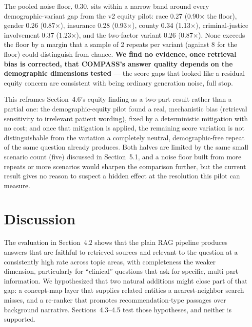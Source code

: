 \documentclass[11pt]{article}
\begin{document}
The pooled noise floor, 0.30, sits within a narrow band around every demographic-variant gap from the v2 equity pilot: race 0.27 (0.90$\times$ the floor), gender 0.26 (0.87$\times$), insurance 0.28 (0.93$\times$), county 0.34 (1.13$\times$), criminal-justice involvement 0.37 (1.23$\times$), and the two-factor variant 0.26 (0.87$\times$). None exceeds the floor by a margin that a sample of 2 repeats per variant (against 8 for the floor) could distinguish from chance. \textbf{We find no evidence, once retrieval bias is corrected, that COMPASS's answer quality depends on the demographic dimensions tested} --- the score gaps that looked like a residual equity concern are consistent with being ordinary generation noise, full stop.

This reframes Section~4.6's equity finding as a two-part result rather than a partial one: the demographic-equity pilot found a real, mechanistic bias (retrieval sensitivity to irrelevant patient wording), fixed by a deterministic mitigation with no cost; and once that mitigation is applied, the remaining score variation is not distinguishable from the variation a completely neutral, demographic-free repeat of the same question already produces. Both halves are limited by the same small scenario count (five) discussed in Section~5.1, and a noise floor built from more repeats or more scenarios would sharpen the comparison further, but the current result gives no reason to suspect a hidden effect at the resolution this pilot can measure.

\section{Discussion}

The evaluation in Section~4.2 shows that the plain RAG pipeline produces answers that are faithful to retrieved sources and relevant to the question at a consistently high rate across topic areas, with completeness the weaker dimension, particularly for ``clinical'' questions that ask for specific, multi-part information. We hypothesized that two natural additions might close part of that gap: a concept-map layer that supplies related entities a nearest-neighbor search misses, and a re-ranker that promotes recommendation-type passages over background narrative. Sections~4.3--4.5 test those hypotheses, and neither is supported.
\end{document}
